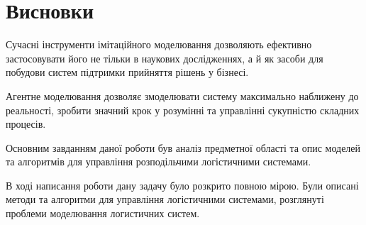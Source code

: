 \section*{Висновки}
Сучасні інструменти імітаційного моделювання дозволяють ефективно застосовувати його не тільки в наукових дослідженнях, а й як засоби для побудови систем підтримки прийняття рішень у бізнесі. 

Агентне моделювання дозволяє змоделювати систему максимально наближену до реальності, зробити значний крок у розумінні та управлінні сукупністю складних процесів.

Основним завданням даної роботи був аналіз предметної області та опис моделей та алгоритмів для управління розподільчими логістичними системами.

В ході написання роботи дану задачу було розкрито повною мірою.
Були описані методи та алгоритми для управління логістичними системами, розглянуті проблеми моделювання логистичних систем.

